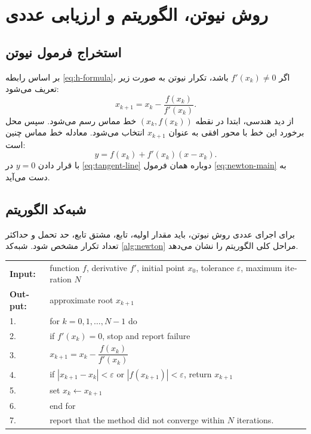 \chapter{روش نیوتن، الگوریتم و ارزیابی عددی}

\section{استخراج فرمول نیوتن}
بر اساس رابطه \cref{eq:h-formula}، اگر $f'(x_k)\neq 0$ باشد، تکرار نیوتن به صورت زیر تعریف می‌شود:
\begin{equation}
 x_{k+1}=x_k-\frac{f(x_k)}{f'(x_k)}.
 \label{eq:newton-main}
\end{equation}
از دید هندسی، ابتدا در نقطه $(x_k,f(x_k))$ خط مماس رسم می‌شود. سپس محل برخورد این خط با محور افقی به عنوان $x_{k+1}$ انتخاب می‌شود. معادله خط مماس چنین است:
\begin{equation}
 y=f(x_k)+f'(x_k)(x-x_k).
 \label{eq:tangent-line}
\end{equation}
با قرار دادن $y=0$ در \cref{eq:tangent-line} دوباره همان فرمول \cref{eq:newton-main} به دست می‌آید.

\section{شبه‌کد الگوریتم}
برای اجرای عددی روش نیوتن، باید مقدار اولیه، تابع، مشتق تابع، حد تحمل و حداکثر تعداد تکرار مشخص شود. شبه‌کد \cref{alg:newton} مراحل کلی الگوریتم را نشان می‌دهد.

\begin{algorithm}[H]
\caption{شبه‌کد روش نیوتن برای حل $f(x)=0$}
\label{alg:newton}
\begin{latin}
\begin{tabular}{ll}
\textbf{Input:} & function $f$, derivative $f'$, initial point $x_0$, tolerance $\varepsilon$, maximum iteration $N$ \\
\textbf{Output:} & approximate root $x_{k+1}$ \\
\hline
1. & for $k=0,1,\ldots,N-1$ do \\
2. & \quad if $f'(x_k)=0$, stop and report failure \\
3. & \quad $x_{k+1}=x_k-\dfrac{f(x_k)}{f'(x_k)}$ \\
4. & \quad if $|x_{k+1}-x_k|<\varepsilon$ or $|f(x_{k+1})|<\varepsilon$, return $x_{k+1}$ \\
5. & \quad set $x_k\leftarrow x_{k+1}$ \\
6. & end for \\
7. & report that the method did not converge within $N$ iterations.
\end{tabular}
\end{latin}
\end{algorithm}

